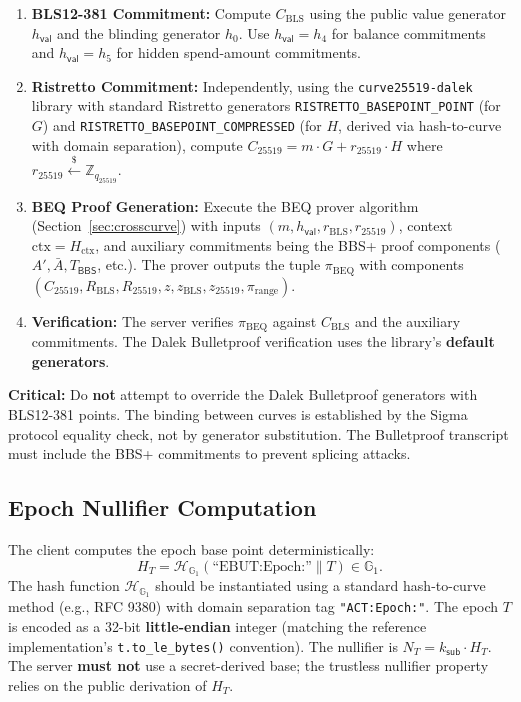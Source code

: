 \documentclass[11pt]{article}
\theoremstyle{definitionstyle}
\theoremstyle{plain}
\begin{document}
\begin{enumerate}[leftmargin=*]
\item \textbf{BLS12-381 Commitment:} Compute $C_{\text{BLS}}$ using the public value generator $h_{\mathsf{val}}$ and the blinding generator $h_0$. Use $h_{\mathsf{val}} = h_4$ for balance commitments and $h_{\mathsf{val}} = h_5$ for hidden spend-amount commitments.
\item \textbf{Ristretto Commitment:} Independently, using the \nolinkurl{curve25519-dalek} library with standard Ristretto generators \nolinkurl{RISTRETTO_BASEPOINT_POINT} (for $G$) and \nolinkurl{RISTRETTO_BASEPOINT_COMPRESSED} (for $H$, derived via hash-to-curve with domain separation), compute $C_{25519} = m \cdot G + r_{25519} \cdot H$ where $r_{25519} \xleftarrow{\$} \mathbb{Z}_{q_{25519}}$.
\item \textbf{BEQ Proof Generation:} Execute the BEQ prover algorithm (Section~\ref{sec:crosscurve}) with inputs $(m, h_{\mathsf{val}}, r_{\text{BLS}}, r_{25519})$, context $\text{ctx} = H_{\text{ctx}}$, and auxiliary commitments being the BBS+ proof components ($A', \bar{A}, T_{\mathsf{BBS}}$, etc.). The prover outputs the tuple $\pi_{\text{BEQ}}$ with components $(C_{25519}, R_{\text{BLS}}, R_{25519}, z, z_{\text{BLS}}, z_{25519}, \pi_{\text{range}})$.
\item \textbf{Verification:} The server verifies $\pi_{\text{BEQ}}$ against $C_{\text{BLS}}$ and the auxiliary commitments. The Dalek Bulletproof verification uses the library's \textbf{default generators}.
\end{enumerate}

\textbf{Critical:} Do \textbf{not} attempt to override the Dalek Bulletproof generators with BLS12-381 points. The binding between curves is established by the Sigma protocol equality check, not by generator substitution. The Bulletproof transcript must include the BBS+ commitments to prevent splicing attacks.

\subsection{Epoch Nullifier Computation}

The client computes the epoch base point deterministically:
\[
H_T = \mathcal{H}_{\mathbb{G}_1}(\text{``EBUT:Epoch:''} \parallel T) \in \mathbb{G}_1.
\]
The hash function $\mathcal{H}_{\mathbb{G}_1}$ should be instantiated using a standard hash-to-curve method (e.g., RFC 9380) with domain separation tag \texttt{"ACT:Epoch:"}. The epoch $T$ is encoded as a 32-bit \textbf{little-endian} integer (matching the reference implementation's \texttt{t.to\_le\_bytes()} convention). The nullifier is $N_T = k_{\mathsf{sub}} \cdot H_T$. The server \textbf{must not} use a secret-derived base; the trustless nullifier property relies on the public derivation of $H_T$.
\end{document}
